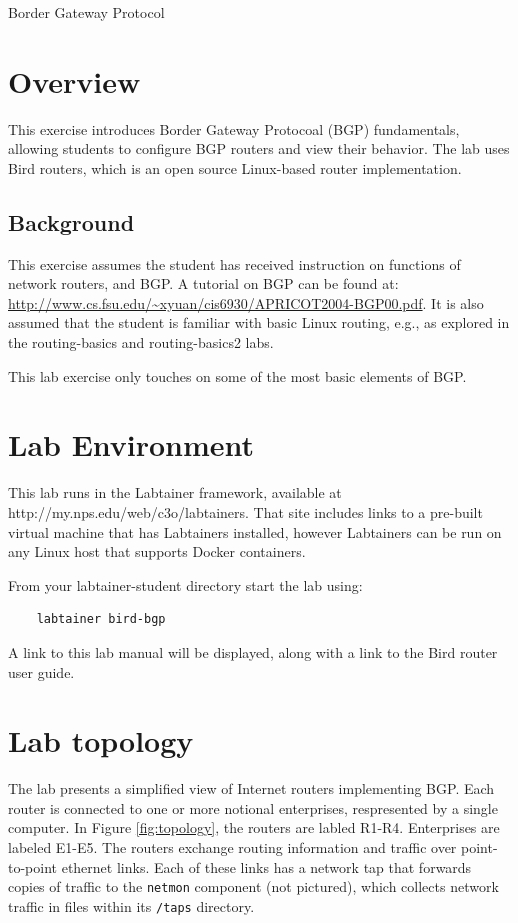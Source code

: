 


\begin{center}
{\LARGE Border Gateway Protocol}
\vspace{0.1in}\\
\end{center}


\section{Overview}
This exercise introduces Border Gateway Protocoal (BGP) fundamentals,
allowing students to configure BGP routers and view their behavior.
The lab uses Bird routers, which is an open source Linux-based router
implementation.

\subsection{Background}
This exercise assumes the student has received instruction on functions
of network routers, and BGP.  A tutorial on BGP can be found at:
\url{http://www.cs.fsu.edu/~xyuan/cis6930/APRICOT2004-BGP00.pdf}.  It is also assumed
that the student is familiar with basic Linux routing, e.g., as explored in the
routing-basics and routing-basics2 labs.

This lab exercise only touches on some of the most basic elements of BGP.

\section{Lab Environment}
This lab runs in the Labtainer framework,
available at http://my.nps.edu/web/c3o/labtainers.
That site includes links to a pre-built virtual machine
that has Labtainers installed, however Labtainers can
be run on any Linux host that supports Docker containers.

From your labtainer-student directory start the lab using:
\begin{verbatim}
    labtainer bird-bgp
\end{verbatim}
A link to this lab manual will be displayed, along with a link to the Bird router 
user guide.

\section{Lab topology}
The lab presents a simplified view of Internet routers implementing BGP.  Each router is connected to one or more notional
enterprises, respresented by a single computer.  In Figure \ref{fig:topology}, the routers are labled R1-R4.  Enterprises
are labeled E1-E5.  The routers exchange routing information and traffic over point-to-point ethernet links.
Each of these links has a network tap that forwards copies of traffic to the {\tt netmon} component (not pictured), 
which collects network traffic in files within its {\tt /taps} directory.


